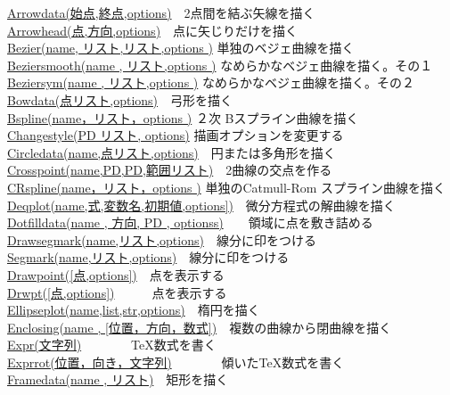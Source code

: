 \documentclass[papersize,a4paper,12pt,uplatex]{jsarticle}
\begin{document}
\begin{tabbing}
\hyperlink{arrowdata}{Arrowdata(始点,終点,options)}　\>2点間を結ぶ矢線を描く\\
\hyperlink{arrowhead}{Arrowhead(点,方向,options)}　\>点に矢じりだけを描く\\
\hyperlink{bezier}{Bezier(name, リスト,リスト,options )} \>単独のベジェ曲線を描く\\
\hyperlink{beziersmooth}{Beziersmooth(name , リスト,options )} \>なめらかなベジェ曲線を描く。その１\\
\hyperlink{beziersym}{Beziersym(name , リスト,options )} \>なめらかなベジェ曲線を描く。その２\\
\hyperlink{bowdata}{Bowdata(点リスト,options)}　\>弓形を描く\\
\hyperlink{bspline}{Bspline(name，リスト，options )}   \>２次 Bスプライン曲線を描く\\
\hyperlink{changestyle}{Changestyle(PD リスト, options)} \>描画オプションを変更する\\
\hyperlink{circledata}{Circledata(name,点リスト,options)}　\>円または多角形を描く\\
\hyperlink{crosspoint}{Crosspoint(name,PD,PD,範囲リスト)}　\>2曲線の交点を作る\\
\hyperlink{cspline}{CRspline(name，リスト，options )} \>単独のCatmull-Rom スプライン曲線を描く\\
\hyperlink{deqplot}{Deqplot(name,式,変数名,初期値,options])}　\>微分方程式の解曲線を描く\\
\hyperlink{dotfilldata}{Dotfilldata(name , 方向, PD , optionss)}　　\>領域に点を敷き詰める\\
\hyperlink{drawsegmark}{Drawsegmark(name,リスト,options)}　\>線分に印をつける\\
\hyperlink{drawsegmark}{Segmark(name,リスト,options)}　\>線分に印をつける\\
\hyperlink{drwpt}{Drawpoint([点,options])}　\>点を表示する\\
\hyperlink{drwpt}{Drwpt([点,options])}　　　\>点を表示する\\
\hyperlink{ellipseplot}{Ellipseplot(name,list,str,options)}　\>楕円を描く\\
\hyperlink{enclosing}{Enclosing(name , [位置，方向，数式])}　\>複数の曲線から閉曲線を描く\\
\hyperlink{expr}{Expr(文字列)}　　　　\>\TeX 数式を書く\\
\hyperlink{exprrot}{Exprrot(位置，向き，文字列)}　　　　\>傾いた\TeX 数式を書く\\
\hyperlink{framedata}{Framedata(name , リスト)}　\>矩形を描く\\

\end{tabbing}
\end{document}
